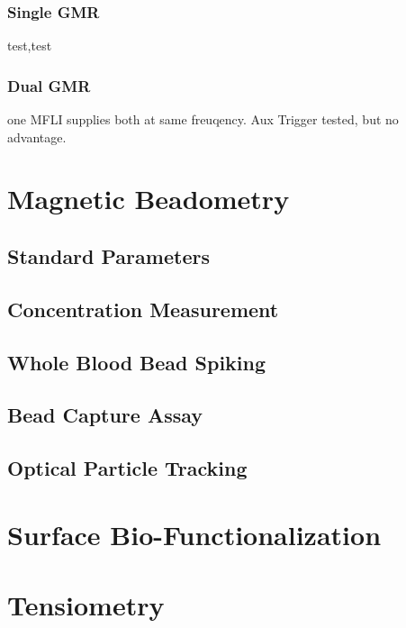 \subsubsection{Single GMR}
test,test
\subsubsection{Dual GMR}
one MFLI supplies both at same freuqency. Aux Trigger tested, but no advantage.

\section{Magnetic Beadometry}

\subsection{Standard Parameters}

\subsection{Concentration Measurement}

\subsection{Whole Blood Bead Spiking}

\subsection{Bead Capture Assay}

\subsection{Optical Particle Tracking}


\section{Surface Bio-Functionalization}


\section{Tensiometry}


